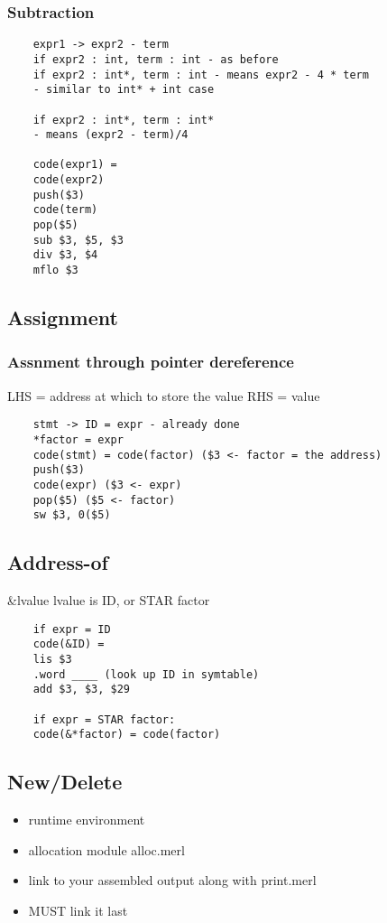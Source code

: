 \documentclass[12pt]{article}
\begin{document}
	\subsubsection*{Subtraction}
	\begin{verbatim}
	expr1 -> expr2 - term
	if expr2 : int, term : int - as before
	if expr2 : int*, term : int - means expr2 - 4 * term
	- similar to int* + int case
	
	if expr2 : int*, term : int*
	- means (expr2 - term)/4
	
	code(expr1) =
	code(expr2)
	push($3)
	code(term)
	pop($5)
	sub $3, $5, $3
	div $3, $4
	mflo $3
	\end{verbatim}
	
	\subsection*{Assignment}
	\subsubsection*{Assnment through pointer dereference}
	LHS = address at which to store the value
	RHS = value
	
	\begin{verbatim}
	stmt -> ID = expr - already done
	*factor = expr
	code(stmt) = code(factor) ($3 <- factor = the address)
	push($3)
	code(expr) ($3 <- expr)
	pop($5) ($5 <- factor)
	sw $3, 0($5)
	\end{verbatim}
	
	\subsection*{Address-of}
	\&lvalue
	lvalue is ID, or STAR factor
	\begin{verbatim}
	if expr = ID
	code(&ID) = 
	lis $3
	.word ____ (look up ID in symtable)
	add $3, $3, $29
	
	if expr = STAR factor:
	code(&*factor) = code(factor)
	\end{verbatim}
	
	\subsection*{New/Delete}
	\begin{itemize}
		\item runtime environment
		\item allocation module alloc.merl
		\item link to your assembled output along with print.merl
		\item MUST link it last
	\end{itemize}
	
\end{document}
